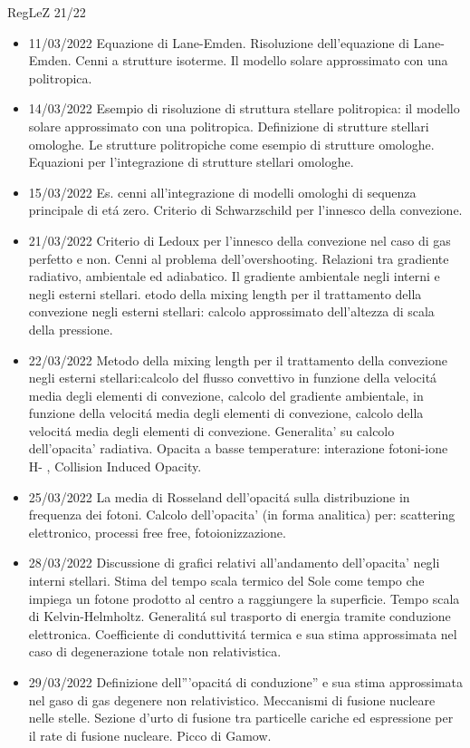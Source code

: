 \begin{frame}[allowframebreaks]{RegLeZ 21/22}
\begin{itemize}
\item 11/03/2022 Equazione di Lane-Emden. Risoluzione dell'equazione di Lane-Emden. Cenni a strutture isoterme. Il modello solare approssimato con una politropica.
\item 14/03/2022 Esempio di risoluzione di struttura stellare politropica: il modello solare approssimato con una politropica. Definizione di strutture stellari omologhe. Le strutture politropiche come esempio di strutture omologhe. Equazioni per l'integrazione di strutture stellari omologhe.
\item 15/03/2022 Es. cenni all'integrazione di modelli omologhi di sequenza principale di et\'a zero. Criterio di Schwarzschild per l'innesco della convezione.
\item 21/03/2022 Criterio di Ledoux per l'innesco della convezione nel caso di gas perfetto e non. Cenni al problema dell'overshooting. Relazioni tra gradiente radiativo, ambientale ed adiabatico. Il gradiente ambientale negli interni e negli esterni stellari. etodo della mixing length per il trattamento della convezione negli esterni stellari: calcolo approssimato dell'altezza di scala della pressione.
\item 22/03/2022 Metodo della mixing length per il trattamento della convezione negli esterni stellari:calcolo del flusso convettivo in funzione della velocit\'a media degli elementi di convezione, calcolo del gradiente ambientale, in funzione della velocit\'a media degli elementi di convezione, calcolo della velocit\'a media degli elementi di convezione. Generalita' su calcolo dell'opacita' radiativa. Opacita a basse temperature: interazione fotoni-ione H- , Collision Induced Opacity.
\item 25/03/2022 La media di Rosseland dell'opacit\'a sulla distribuzione in frequenza dei fotoni. Calcolo dell'opacita' (in forma analitica) per: scattering elettronico, processi free free, fotoionizzazione.
\item 28/03/2022 Discussione di grafici relativi all'andamento dell'opacita' negli interni stellari. Stima del tempo scala termico del Sole come tempo che impiega un fotone prodotto al centro a raggiungere la superficie. Tempo scala di Kelvin-Helmholtz. Generalit\'a sul trasporto di energia tramite conduzione elettronica. Coefficiente di conduttivit\'a termica e sua stima approssimata nel caso di degenerazione totale non relativistica.
\item 29/03/2022 Definizione dell'''opacit\'a di conduzione'' e sua stima approssimata nel gaso di gas degenere non relativistico. Meccanismi di fusione nucleare nelle stelle. Sezione d'urto di fusione tra particelle cariche ed espressione per il rate di fusione nucleare. Picco di Gamow.

\end{itemize}
\end{frame}
